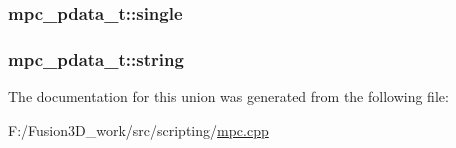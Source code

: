 \subsubsection[{single}]{ mpc\+\_\+pdata\+\_\+t\+::single}\label{unionmpc__pdata__t_a948bac6a5531683d547ad6d07de195d2}
\hypertarget{unionmpc__pdata__t_a8a6e92a40456201ce239083f5ba988e0}{}
\subsubsection[{string}]{ mpc\+\_\+pdata\+\_\+t\+::string}\label{unionmpc__pdata__t_a8a6e92a40456201ce239083f5ba988e0}


The documentation for this union was generated from the following file\+:\begin{DoxyCompactItemize}
\item 
F\+:/\+Fusion3\+D\+\_\+work/src/scripting/\hyperlink{mpc_8cpp}{mpc.\+cpp}\end{DoxyCompactItemize}
